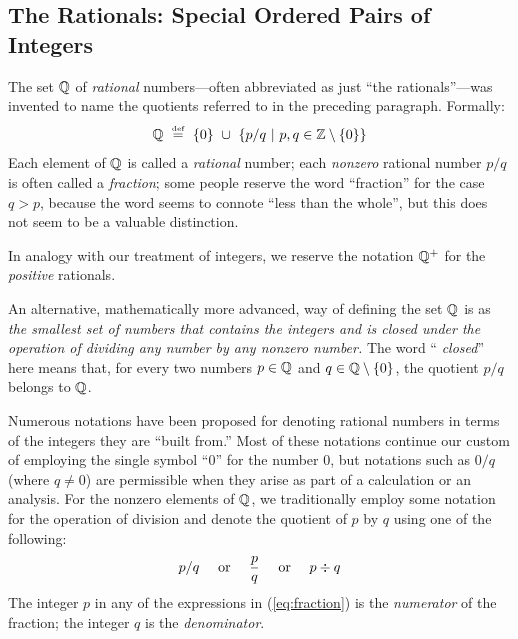\subsection{The Rationals: Special Ordered Pairs of Integers}
\label{sec:define-rationals}

The set $\mathbb{Q}$ of {\it rational} 
numbers---often abbreviated as just ``the rationals''---was invented
to name the quotients referred to in the preceding paragraph.
Formally:
\[ \mathbb{Q} \ \stackrel{\mbox{{\tiny def}}}{=} \ \{0\} \ \cup \ \left\{ p/q \ | \ p, q \in \mathbb{Z}
\setminus \{0\} \right\}
\]
Each element of $\mathbb{Q}$ is called a {\it rational} number;
 each {\em nonzero} rational number $p/q$ is
often called a {\em fraction};  some people
reserve the word ``fraction'' for the case $q > p$, because the word
seems to connote ``less than the whole'', but this does not seem to be
a valuable distinction.

In analogy with our treatment of integers, we reserve the notation
$\mathbb{Q}^+$ for the {\em positive} rationals.

An alternative, mathematically more advanced, way of defining the set
$\mathbb{Q}$ is as {\em the smallest set of numbers that contains the integers
  and is closed under the operation of dividing any number by any
  nonzero number.}   The word ``{\it
  closed}'' here means that, for every two numbers $p \in \mathbb{Q}$ and $q
\in \mathbb{Q} \setminus \{0\}$, the quotient $p/q$ belongs to $\mathbb{Q}$.

Numerous notations have been proposed for denoting rational numbers in
terms of the integers they are ``built from.''  Most of these
notations continue our custom of employing the single symbol ``$0$''
for the number $0$, but notations such as $0/q$ (where $q \neq 0$) are
permissible when they arise as part of a calculation or an analysis.
For the nonzero elements of $\mathbb{Q}$, we traditionally employ some
notation for the operation of division and denote the quotient of $p$
by $q$ using one of the following:
\begin{equation}
\label{eq:fraction}
 p/q \ \ \ \mbox{ or } \ \ \ {p \over q} \ \ \ \mbox{ or } \ \ \ p
 \div q
\end{equation}
The integer $p$ in any of the expressions in (\ref{eq:fraction}) is
the {\it numerator}
of the fraction; the integer $q$ is the {\it denominator}.



